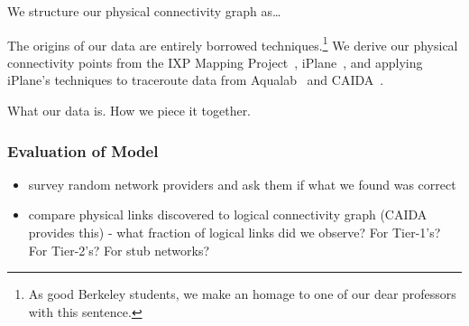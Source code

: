     We structure our physical connectivity graph as\ldots

    The origins of our data are entirely borrowed techniques.\footnote{As good
    Berkeley students, we make an homage to one of our dear professors with
    this sentence.} We derive our physical connectivity points from the IXP
    Mapping Project~\cite{ixps-mapped}, iPlane~\cite{iplane}, and applying
    iPlane's techniques to traceroute data from Aqualab~\cite{sidewalk} and
    CAIDA~\cite{caidadata}.

        What our data is.
        How we piece it together.
        \subsubsection*{Evaluation of Model}
            \begin{itemize}
        \item survey random network providers and ask them if what we
        found was correct
        \item compare physical links discovered to logical connectivity
        graph (CAIDA provides this) - what fraction of logical links
        did we observe? For Tier-1's? For Tier-2's? For stub networks?
            \end{itemize} 


